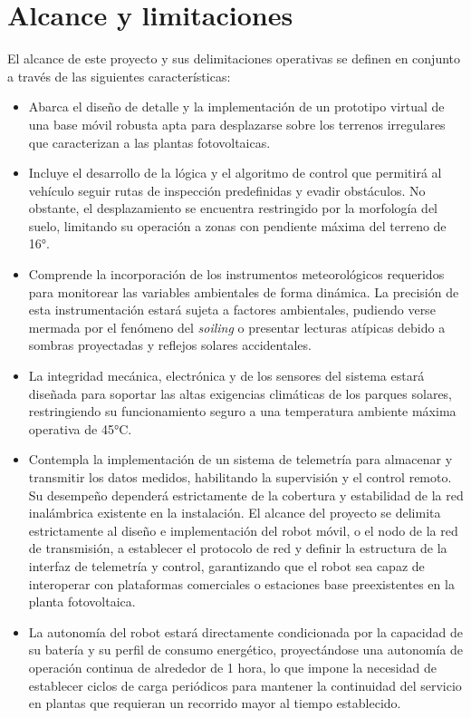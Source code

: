 \documentclass[../../General.tex]{subfiles}
\begin{document}
\section{Alcance y limitaciones}
El alcance de este proyecto y sus delimitaciones operativas se definen en conjunto a través de las siguientes características:

\begin{itemize}
    \item Abarca el diseño de detalle y la implementación de un prototipo virtual de una base móvil robusta apta para desplazarse sobre los terrenos irregulares que caracterizan a las plantas fotovoltaicas.
    \item Incluye el desarrollo de la lógica y el algoritmo de control que permitirá al vehículo seguir rutas de inspección predefinidas y evadir obstáculos. No obstante, el desplazamiento se encuentra restringido por la morfología del suelo, limitando su operación a zonas con pendiente máxima del terreno de 16°.
    \item Comprende la incorporación de los instrumentos meteorológicos requeridos para monitorear las variables ambientales de forma dinámica. La precisión de esta instrumentación estará sujeta a factores ambientales, pudiendo verse mermada por el fenómeno del \textit{soiling} o presentar lecturas atípicas debido a sombras proyectadas y reflejos solares accidentales.
    \item La integridad mecánica, electrónica y de los sensores del sistema estará diseñada para soportar las altas exigencias climáticas de los parques solares, restringiendo su funcionamiento seguro a una temperatura ambiente máxima operativa de 45°C.
    \item Contempla la implementación de un sistema de telemetría para almacenar y transmitir los datos medidos, habilitando la supervisión y el control remoto. Su desempeño dependerá estrictamente de la cobertura y estabilidad de la red inalámbrica existente en la instalación. El alcance del proyecto se delimita estrictamente al diseño e implementación del robot móvil, o el nodo de la red de transmisión, a establecer el protocolo de red y definir la estructura de la interfaz de telemetría y control, garantizando que el robot sea capaz de interoperar con plataformas comerciales o estaciones base preexistentes en la planta fotovoltaica.
    \item La autonomía del robot estará directamente condicionada por la capacidad de su batería y su perfil de consumo energético, proyectándose una autonomía de operación continua de alrededor de 1 hora, lo que impone la necesidad de establecer ciclos de carga periódicos para mantener la continuidad del servicio en plantas que requieran un recorrido mayor al tiempo establecido.
\end{itemize}
\end{document}
